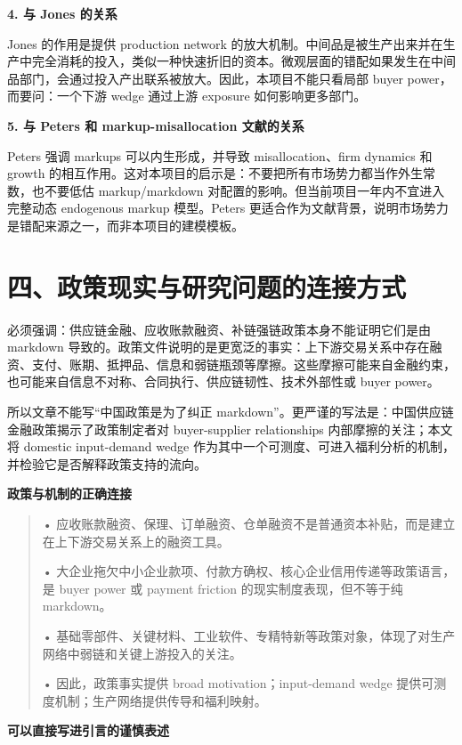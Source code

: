 \documentclass[
  12pt,
]{ctexart}
\begin{document}
\textbf{4. 与 Jones 的关系}

Jones 的作用是提供 production network 的放大机制。中间品是被生产出来并在生产中完全消耗的投入，类似一种快速折旧的资本。微观层面的错配如果发生在中间品部门，会通过投入产出联系被放大。因此，本项目不能只看局部 buyer power，而要问：一个下游 wedge 通过上游 exposure 如何影响更多部门。

\textbf{5. 与 Peters 和 markup-misallocation 文献的关系}

Peters 强调 markups 可以内生形成，并导致 misallocation、firm dynamics 和 growth 的相互作用。这对本项目的启示是：不要把所有市场势力都当作外生常数，也不要低估 markup/markdown 对配置的影响。但当前项目一年内不宜进入完整动态 endogenous markup 模型。Peters 更适合作为文献背景，说明市场势力是错配来源之一，而非本项目的建模模板。

\section{四、政策现实与研究问题的连接方式}\label{ux56dbux653fux7b56ux73b0ux5b9eux4e0eux7814ux7a76ux95eeux9898ux7684ux8fdeux63a5ux65b9ux5f0f}

必须强调：供应链金融、应收账款融资、补链强链政策本身不能证明它们是由 markdown 导致的。政策文件说明的是更宽泛的事实：上下游交易关系中存在融资、支付、账期、抵押品、信息和弱链瓶颈等摩擦。这些摩擦可能来自金融约束，也可能来自信息不对称、合同执行、供应链韧性、技术外部性或 buyer power。

所以文章不能写``中国政策是为了纠正 markdown''。更严谨的写法是：中国供应链金融政策揭示了政策制定者对 buyer-supplier relationships 内部摩擦的关注；本文将 domestic input-demand wedge 作为其中一个可测度、可进入福利分析的机制，并检验它是否解释政策支持的流向。

\textbf{政策与机制的正确连接}

\begin{quote}
• 应收账款融资、保理、订单融资、仓单融资不是普通资本补贴，而是建立在上下游交易关系上的融资工具。

• 大企业拖欠中小企业款项、付款方确权、核心企业信用传递等政策语言，是 buyer power 或 payment friction 的现实制度表现，但不等于纯 markdown。

• 基础零部件、关键材料、工业软件、专精特新等政策对象，体现了对生产网络中弱链和关键上游投入的关注。

• 因此，政策事实提供 broad motivation；input-demand wedge 提供可测度机制；生产网络提供传导和福利映射。
\end{quote}

\textbf{可以直接写进引言的谨慎表述}
\end{document}
